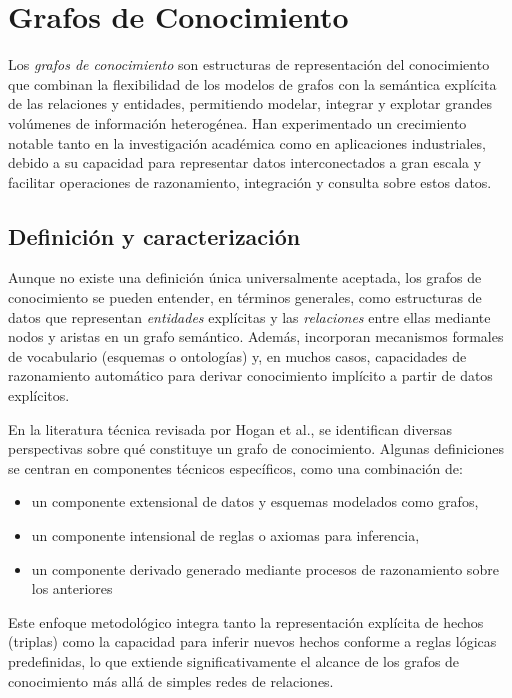 \documentclass{article}
\begin{document}
\section{Grafos de Conocimiento}

Los \textit{grafos de conocimiento} son estructuras de representación del conocimiento que combinan la flexibilidad de los modelos de grafos con la semántica explícita de las relaciones y entidades, permitiendo modelar, integrar y explotar grandes volúmenes de información heterogénea. Han experimentado un crecimiento notable tanto en la investigación académica como en aplicaciones industriales, debido a su capacidad para representar datos interconectados a gran escala y facilitar operaciones de razonamiento, integración y consulta sobre estos datos.

\subsection{Definición y caracterización}

Aunque no existe una definición única universalmente aceptada, los grafos de conocimiento se pueden entender, en términos generales, como estructuras de datos que representan \textit{entidades} explícitas y las \textit{relaciones} entre ellas mediante nodos y aristas en un grafo semántico. Además, incorporan mecanismos formales de vocabulario (esquemas o ontologías) y, en muchos casos, capacidades de razonamiento automático para derivar conocimiento implícito a partir de datos explícitos.

En la literatura técnica revisada por Hogan et al., se identifican diversas perspectivas sobre qué constituye un grafo de conocimiento. Algunas definiciones se centran en componentes técnicos específicos, como una combinación de:
\begin{itemize}
    \item un componente extensional de datos y esquemas modelados como grafos, 
    \item un componente intensional de reglas o axiomas para inferencia,
    \item un componente derivado generado mediante procesos de razonamiento sobre los anteriores
\end{itemize}

Este enfoque metodológico integra tanto la representación explícita de hechos (triplas) como la capacidad para inferir nuevos hechos conforme a reglas lógicas predefinidas, lo que extiende significativamente el alcance de los grafos de conocimiento más allá de simples redes de relaciones.
\end{document}
